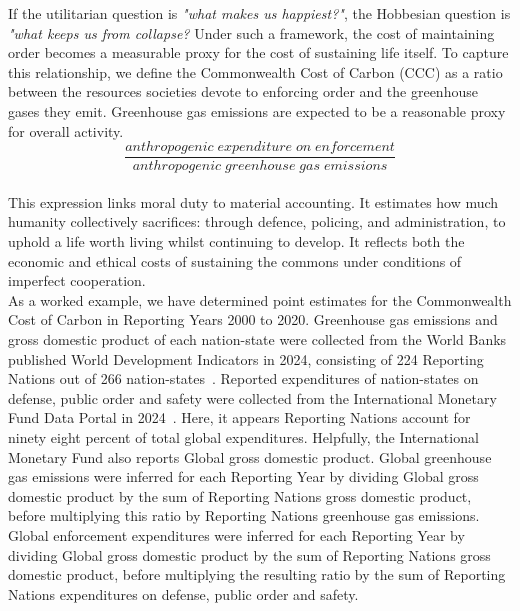 If the utilitarian question is \emph{"what makes us happiest?"}, the Hobbesian question is \emph{"what keeps us from collapse?}
Under such a framework, the cost of maintaining order becomes a measurable proxy for the cost of sustaining life itself.
To capture this relationship, we define the Commonwealth Cost of Carbon (CCC) as a ratio between the resources societies devote to enforcing order and the greenhouse gases they emit.
Greenhouse gas emissions are expected to be a reasonable proxy for overall activity.\\

\begin{equation}
	\frac{anthropogenic\; expenditure\; on\; enforcement}{anthropogenic\; greenhouse\; gas\; emissions}
\end{equation}\\

This expression links moral duty to material accounting.
It estimates how much humanity collectively sacrifices: through defence, policing, and administration, to uphold a life worth living whilst continuing to develop.
It reflects both the economic and ethical costs of sustaining the commons under conditions of imperfect cooperation.\\

As a worked example, we have determined point estimates for the Commonwealth Cost of Carbon in Reporting Years 2000 to 2020.
Greenhouse gas emissions and gross domestic product of each nation-state were collected from the World Banks published World Development Indicators in 2024, consisting of 224 Reporting Nations out of 266 nation-states~\cite{wbank}.
Reported expenditures of nation-states on defense, public order and safety were collected from the International Monetary Fund Data Portal in 2024~\cite{imf}.
Here, it appears Reporting Nations account for ninety eight percent of total global expenditures.
Helpfully, the International Monetary Fund also reports Global gross domestic product.
Global greenhouse gas emissions were inferred for each Reporting Year by dividing Global gross domestic product by the sum of Reporting Nations gross domestic product, before multiplying this ratio by Reporting Nations greenhouse gas emissions.
Global enforcement expenditures were inferred for each Reporting Year by dividing Global gross domestic product by the sum of Reporting Nations gross domestic product, before multiplying the resulting ratio by the sum of Reporting Nations expenditures on defense, public order and safety.\\

